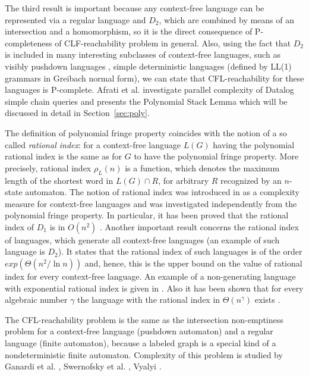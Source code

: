 \documentclass{ws-ijfcs}
\begin{document}
The third result is important because any context-free language can be represented via a regular language and $D_2$, which are combined by means of an intersection and a homomorphism, so it is the direct consequence of P-completeness of CLF-reachability problem in general. Also, using the fact that $D_2$ is included in many interesting subclasses of context-free languages, such as visibly pushdown languages \cite{Okhotin2014ComplexityOI}, simple deterministic languages (defined by LL(1) grammars in Greibach normal form), we can state that CFL-reachability for these languages is P-complete. Afrati et al. \cite{ChainQ} investigate parallel complexity of Datalog simple chain queries and presents the Polynomial Stack Lemma which will be discussed in detail in Section~\ref{sec:poly}. 


The definition of polynomial fringe property coincides with the notion of a so called \textit{rational index}: for a context-free language $L(G)$ having the polynomial rational index is the same as for $G$ to have the polynomial fringe property. More precisely, rational index $\rho_L(n)$ is a function, which denotes the maximum length of the shortest word in $L(G) \cap R$, for arbitrary $R$ recognized by an $n$-state automaton. The notion of rational index was introduced in \cite{RatBasic} as a complexity measure for context-free languages and was investigated independently from the polynomial fringe property.  In particular, it has been proved that the rational index of $D_1$ is in $O( n^2)$ \cite{Dyck1}. 
Another important result concerns the rational index of languages, which generate all context-free languages (an example of such language is $D_2$). It states that the rational index of such languages is of the order $exp(\Theta(n^2/\ln n))$ \cite{CFRat} and, hence, this is the upper bound on the value of rational index for every context-free language. An example of a non-generating language with exponential rational index is given in \cite{Regularrealizability}. Also it has been shown that for every algebraic number $\gamma $ the language with the rational index in $\Theta (n^\gamma )$ exists \cite{GreibRat}. 


The CFL-reachability problem is the same as the intersection non-emptiness problem for a context-free language (pushdown automaton) and a regular language (finite automaton), because a labeled graph is a special kind of a nondeterministic finite automaton. Complexity of this problem is studied by Ganardi et al. \cite{ ganardi2016circuit} ,  Swernofsky et al. \cite{Intersection}, Vyalyi \cite{VyalyiRR}.
\end{document}
